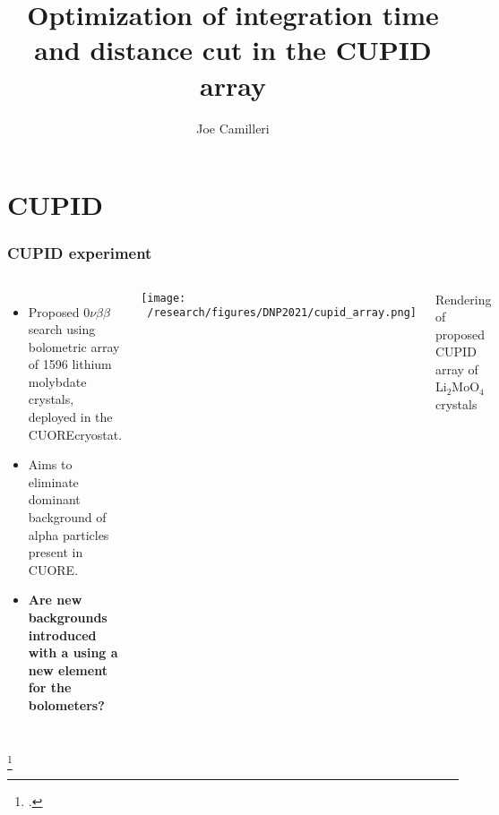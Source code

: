 \documentclass{beamer}
\title[CUPID array]{Optimization of integration time and distance cut in the CUPID array} %
\author{Joe Camilleri} %
\institute[Virginia Tech] %
{
	DNP October 2021 \\ %
	\medskip
	\textbf{Mini-Symposium: Neutrinos and Nuclei XII: Double Beta Decay Analysis Techniques}
}
\begin{document}
	
	\begin{frame}
		\titlepage %
	\end{frame}
	
	
	
	\section{CUPID}
	\begin{frame}
		\frametitle{CUPID experiment}
		\begin{columns}[c] %
			
			\begin{itemize}
				\item Proposed $0\nu\beta\beta$ search using bolometric array of 1596 lithium molybdate crystals, deployed in the CUORE\footnotemark cryostat.
				\item Aims to eliminate dominant background of alpha particles present in CUORE.
				\item \textbf{Are new backgrounds introduced with a using a new element for the bolometers?}
			\end{itemize}
			
			\texttt{[image: ~/research/figures/DNP2021/cupid\_array.png]}
			\caption{Rendering of proposed CUPID array of Li$_2$MoO$_4$ crystals}
			
		\end{columns}
		\footcitetext{squid}
	\end{frame}
	
\end{document}
